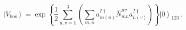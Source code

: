 \begin{equation}
\left|V_{\mbox{bos}}\right>=\exp\left\{\frac{1}{2}\sum_{u,v=1}^3\left(\sum_{m,n}
a^{I\dagger}_{m(u)}{\bar N}^{uv}_{mn}a^{I\dagger}_{n(v)}
\right)\right\}\left|0\right>_{123}\,.
\end{equation}

